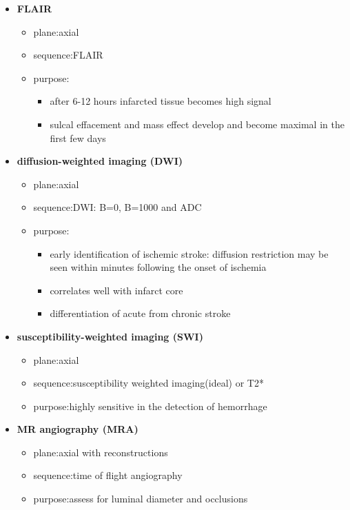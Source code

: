 \begin{itemize}
	\tightlist
	\item
	\textbf{FLAIR}
	
	\begin{itemize}
		\tightlist
		\item
		plane:axial
		\item
		sequence:FLAIR
		\item
		purpose:
		
		\begin{itemize}
			\tightlist
			\item
			after 6-12 hours infarcted tissue becomes high signal 
			\item
			sulcal effacement and mass effect develop and become maximal in the first few days
		\end{itemize}
	\end{itemize}
	\item
	\textbf{diffusion-weighted imaging (DWI)}
	
	\begin{itemize}
		\tightlist
		\item
		plane:axial
		\item
		sequence:DWI: B=0, B=1000 and ADC
		\item
		purpose:
		
		\begin{itemize}
			\tightlist
			\item
			early identification of ischemic stroke: diffusion restriction may be seen within minutes following the onset of ischemia 
			\item
			correlates well with infarct core
			\item
			differentiation of acute from chronic stroke
		\end{itemize}
	\end{itemize}
	\item
	\textbf{susceptibility-weighted imaging (SWI)}
	
	\begin{itemize}
		\tightlist
		\item
		plane:axial
		\item
		sequence:susceptibility weighted imaging(ideal) or T2*
		\item
		purpose:highly sensitive in the detection of hemorrhage
	\end{itemize}
\end{itemize}

\begin{itemize}
	\tightlist
	\item
	\textbf{\textbf{MR angiography (MRA)}}
	
	\begin{itemize}
		\tightlist
		\item
		\textbf{\textbf{\hspace{0pt}}\textbf{\hspace{0pt}}}plane:axial with reconstructions
		\item
		sequence:time of flight angiography
		\item
		purpose:assess for luminal diameter and occlusions
	\end{itemize}
\end{itemize}

